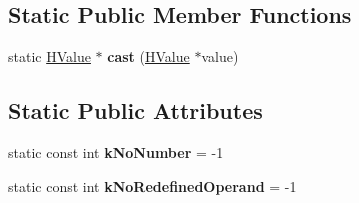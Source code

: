 \subsection*{Static Public Member Functions}
\begin{DoxyCompactItemize}
\item 
\hypertarget{classv8_1_1internal_1_1_h_value_a02515139f93e2d36d78e3df91486dd20}{}static \hyperlink{classv8_1_1internal_1_1_h_value}{H\+Value} $\ast$ {\bfseries cast} (\hyperlink{classv8_1_1internal_1_1_h_value}{H\+Value} $\ast$value)\label{classv8_1_1internal_1_1_h_value_a02515139f93e2d36d78e3df91486dd20}

\end{DoxyCompactItemize}
\subsection*{Static Public Attributes}
\begin{DoxyCompactItemize}
\item 
\hypertarget{classv8_1_1internal_1_1_h_value_aa214d3303d177f1cade823cce1ad8e69}{}static const int {\bfseries k\+No\+Number} = -\/1\label{classv8_1_1internal_1_1_h_value_aa214d3303d177f1cade823cce1ad8e69}

\item 
\hypertarget{classv8_1_1internal_1_1_h_value_a06b0ac46b10987c3b19a99211c61c355}{}static const int {\bfseries k\+No\+Redefined\+Operand} = -\/1\label{classv8_1_1internal_1_1_h_value_a06b0ac46b10987c3b19a99211c61c355}

\end{DoxyCompactItemize}

